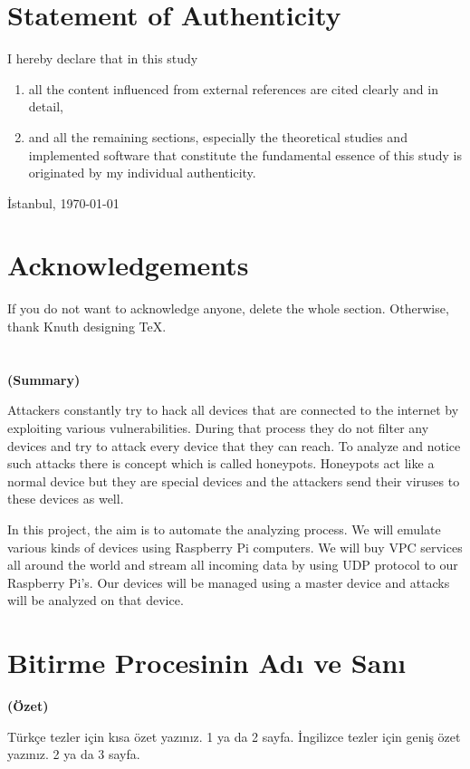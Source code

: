 \documentclass[a4paper, 12pt]{article}
\def\baslik{Bitirme Procesinin Adı ve Sanı}
\def\signPlace{İstanbul}
\def\signDate{\today}
\def\ozbil{%
\section*{Özgünlük Bildirisi}
\begin{enumerate}
    \item Bu çalışmada, başka kaynaklardan yapılan tüm alıntıların, ilgili kaynaklar referans gösterilerek açıkça belirtildiğini,
    \item Alıntılar dışındaki bölümlerin, özellikle projenin ana konusunu oluşturan teorik çalışmaların ve yazılım/donanımın tarafımdan yapıldığını
    bildiririm.
\end{enumerate}
\vspace{1em}
\signPlace, \signDate
\vspace{3em}\\
}%
\def\ack{Teşekkürler}%
\def\ozbil{%
\section*{Statement of Authenticity}
I hereby declare that in this study
\begin{enumerate}
    \item all the content influenced from external references are cited clearly and in detail,
    \item and all the remaining sections, especially the theoretical studies and implemented
software that constitute the fundamental essence of this study is originated by my individual authenticity.
\end{enumerate}
\vspace{1em}
\signPlace, \signDate
\vspace{3em}\\
}%
\def\ack{Acknowledgements}%
\begin{document}
\newpage
\ozbil\@author\newpage
\section*{\ack}
If you do not want to acknowledge anyone, delete the whole section. Otherwise, thank Knuth designing \TeX .

\newpage
\section*{\@title}
\centerline{\large\bfseries (Summary)}

\par Attackers constantly try to hack all devices that are connected to the internet by exploiting various vulnerabilities. During that process they do not filter any devices and try to attack every device that they can reach. To analyze and notice such attacks there is concept which is called honeypots. Honeypots act like a normal device but they are special devices and the attackers send their viruses to these devices as well. 

\par In this project, the aim is to automate the analyzing process. We will emulate various kinds of devices using Raspberry Pi computers. We will buy VPC services all around the world and stream all incoming data by using UDP protocol to our Raspberry Pi's. Our devices will be managed using a master device and attacks will be analyzed on that device.

\newpage
\section*{\baslik}
\centerline{\large\bfseries (Özet)}
Türkçe tezler için kısa özet yazınız. 1 ya da 2 sayfa. İngilizce tezler için geniş özet yazınız. 2 ya da 3 sayfa.

\newpage
\tableofcontents
\newpage
\listoffigures
\newpage
\listoftables
\newpage
\makeatother

\else
\fi

\end{document}

